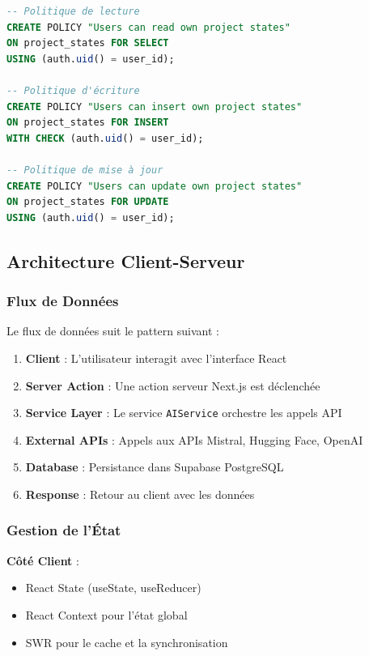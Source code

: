 \begin{lstlisting}[language=SQL, caption=Politique RLS]
-- Politique de lecture
CREATE POLICY "Users can read own project states"
ON project_states FOR SELECT
USING (auth.uid() = user_id);

-- Politique d'écriture
CREATE POLICY "Users can insert own project states"
ON project_states FOR INSERT
WITH CHECK (auth.uid() = user_id);

-- Politique de mise à jour
CREATE POLICY "Users can update own project states"
ON project_states FOR UPDATE
USING (auth.uid() = user_id);
\end{lstlisting}

\subsection{Architecture Client-Serveur}

\subsubsection{Flux de Données}

Le flux de données suit le pattern suivant :

\begin{enumerate}[leftmargin=*]
    \item \textbf{Client} : L'utilisateur interagit avec l'interface React
    \item \textbf{Server Action} : Une action serveur Next.js est déclenchée
    \item \textbf{Service Layer} : Le service \texttt{AIService} orchestre les appels API
    \item \textbf{External APIs} : Appels aux APIs Mistral, Hugging Face, OpenAI
    \item \textbf{Database} : Persistance dans Supabase PostgreSQL
    \item \textbf{Response} : Retour au client avec les données
\end{enumerate}

\subsubsection{Gestion de l'État}

\textbf{Côté Client} :
\begin{itemize}[leftmargin=*]
    \item React State (useState, useReducer)
    \item React Context pour l'état global
    \item SWR pour le cache et la synchronisation
\end{itemize}

